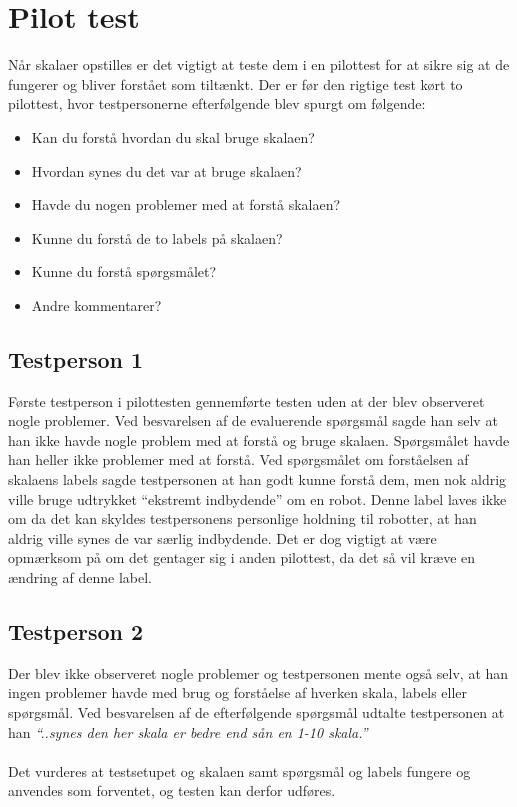 \section*{Pilot test}
\label{pilottest}
%
Når skalaer opstilles er det vigtigt at teste dem i en pilottest for at sikre sig at de fungerer og bliver forstået som tiltænkt. Der er før den rigtige test kørt to pilottest, hvor testpersonerne efterfølgende blev spurgt om følgende:\blankline
%
\begin{itemize}
	\item Kan du forstå hvordan du skal bruge skalaen?
	\item Hvordan synes du det var at bruge skalaen?
	\item Havde du nogen problemer med at forstå skalaen?
	\item Kunne du forstå de to labels på skalaen?
	\item Kunne du forstå spørgsmålet?
	\item Andre kommentarer?
\end{itemize} 

\subsection*{Testperson 1}
Første testperson i pilottesten gennemførte testen uden at der blev observeret nogle problemer. Ved besvarelsen af de evaluerende spørgsmål sagde han selv at han ikke havde nogle problem med at forstå og bruge skalaen. Spørgsmålet havde han heller ikke problemer med at forstå. 
Ved spørgsmålet om forståelsen af skalaens labels sagde testpersonen at han godt kunne forstå dem, men nok aldrig ville bruge udtrykket ``ekstremt indbydende'' om en robot. Denne label laves ikke om da det kan skyldes testpersonens personlige holdning til robotter, at han aldrig ville synes de var særlig indbydende. Det er dog vigtigt at være opmærksom på om det gentager sig i anden pilottest, da det så vil kræve en ændring af denne label.

\subsection*{Testperson 2}
Der blev ikke observeret nogle problemer og testpersonen mente også selv, at han ingen problemer havde med brug og forståelse af hverken skala, labels eller spørgsmål. Ved besvarelsen af de efterfølgende spørgsmål udtalte testpersonen at han \textit{``..synes den her skala er bedre end sån en 1-10 skala.''}
\\\\
Det vurderes at testsetupet og skalaen samt spørgsmål og labels fungere og anvendes som forventet, og testen kan derfor udføres. 